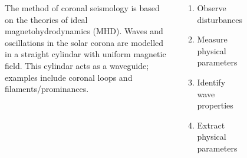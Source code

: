 \documentclass[t]{beamer}
\begin{document}
\begin{frame}[t]{}{}
    \begin{tcolorbox}[colback=mygray!5,colframe=mygray!40!mygray,
        title=Coronal Seismology: Application to Bright Points in a Coronal Hole]
    \begin{columns}
        \par\vspace{1in}
        \begin{tcolorbox}[colback=mygray!5,colframe=mygray!40!mygray,
            fonttitle=\sffamily\bfseries\large,
            title=Background \& Motivation]
            The method of coronal seismology is based on the theories of
            ideal magnetohydrodynamics (MHD). Waves and oscillations in the
            solar corona are modelled in a straight cylindar with uniform
            magnetic field. This cylindar acts as a waveguide; examples include
            coronal loops and filaments/prominances.
        \end{tcolorbox}
        \par\vspace{1in}
        \begin{tcolorbox}[colback=mygray!5,colframe=mygray!40!mygray,
            title=Coronal Seismology]
            \begin{enumerate}
                \item Observe disturbances
                \item Measure physical parameters
                \item Identify wave properties
                \item Extract physical parameters
            \end{enumerate}
        \end{tcolorbox}
        \par\vspace{1in}
        \begin{tcolorbox}[colback=mygray!5,colframe=mygray!40!mygray,
            title=Data]
            \begin{figure}
                \vspace{0.1\textwidth}

\end{figure}
\end{tcolorbox}
\end{columns}
\end{tcolorbox}
\end{frame}
\end{document}

